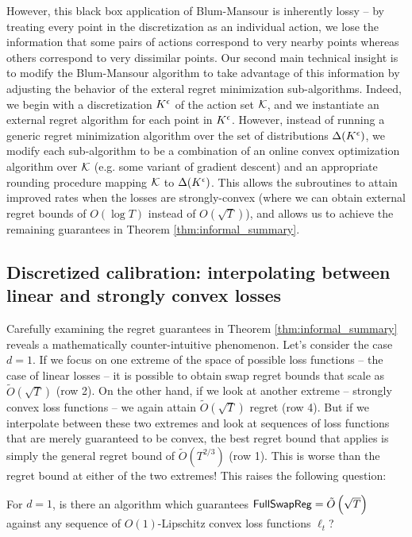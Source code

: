 \documentclass[final,12pt]{alt2025}
\begin{document}
However, this black box application of Blum-Mansour is inherently lossy -- by treating every point in the discretization as an individual action, we lose the information that some pairs of actions correspond to very nearby points whereas others correspond to very dissimilar points. Our second main technical insight is to modify the Blum-Mansour algorithm to take advantage of this information by adjusting the behavior of the exteral regret minimization sub-algorithms.  Indeed, we begin with a discretization $K^{\epsilon}$ of the action set $\mathcal{K}$, and we instantiate an external regret algorithm for each point in $K^{\epsilon}$.  However, instead of running a generic regret minimization algorithm over the set of distributions $\Delta(K^{\epsilon})$, we modify each sub-algorithm to be a combination of an online convex optimization algorithm over $\mathcal{K}$ (e.g. some variant of gradient descent) and an appropriate rounding procedure mapping $\mathcal{K}$ to $\Delta(K^{\epsilon})$. This allows the subroutines to attain improved rates when the losses are strongly-convex (where we can obtain external regret bounds of $O(\log T)$ instead of $O(\sqrt{T})$), and allows us to achieve the remaining guarantees in Theorem \ref{thm:informal_summary}. 

\subsection{Discretized calibration: interpolating between linear and strongly convex losses}

Carefully examining the regret guarantees in Theorem \ref{thm:informal_summary} reveals a mathematically counter-intuitive phenomenon. Let's consider the case $d=1$. If we focus on one extreme of the space of possible loss functions -- the case of linear losses -- it is possible to obtain swap regret bounds that scale as $\tilde O(\sqrt{T})$ (row 2). On the other hand, if we look at another extreme -- strongly convex loss functions -- we again attain $\tilde O(\sqrt{T})$ regret (row 4). But if we interpolate between these two extremes and look at sequences of loss functions that are merely guaranteed to be convex, the best regret bound that applies is simply the general regret bound of $\tilde{O}(T^{2/3})$ (row 1). This is worse than the regret bound at either of the two extremes! This raises the following question:

\begin{question}\label{question:convex-question}
For $d=1$, is there an algorithm which guarantees $\mathsf{FullSwapReg} = \tilde{O}\left(\sqrt{T}\right)$ against any sequence of $O(1)$-Lipschitz convex loss functions $\ell_t$?
\end{question}
\end{document}
